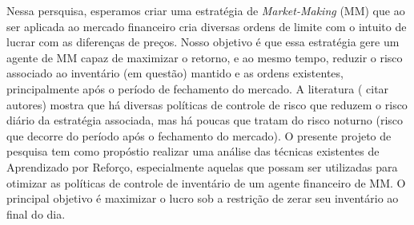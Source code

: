Nessa persquisa, esperamos criar uma estratégia de \textit{Market-Making} (MM) que ao ser aplicada ao mercado financeiro cria diversas ordens de limite com o intuito de lucrar com as diferenças de preços. Nosso objetivo é que essa estratégia gere um agente de MM capaz de maximizar o retorno, e ao mesmo tempo, reduzir o risco associado ao inventário  (em questão) mantido e as ordens existentes, principalmente após o período de fechamento do mercado. A literatura ( citar autores) mostra que há diversas políticas de controle de risco que reduzem o risco diário da estratégia associada, mas há poucas que tratam do risco noturno (risco que decorre do período após o fechamento do mercado). O presente projeto de pesquisa  tem como propóstio realizar uma análise das técnicas existentes de Aprendizado por Reforço, especialmente aquelas que possam ser utilizadas para otimizar as políticas de controle de inventário de um agente financeiro de MM. O principal objetivo é  maximizar o lucro sob a restrição de zerar seu inventário ao final do dia.


